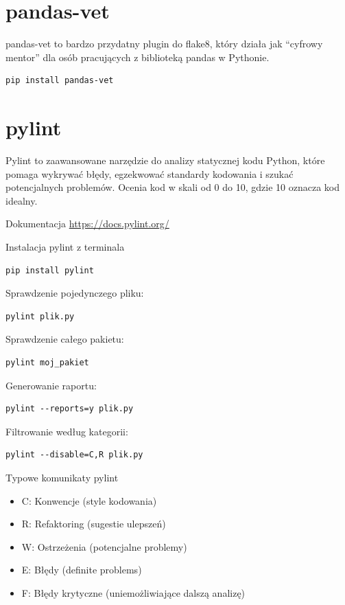 \documentclass[
  polish,
  letterpaper,
  DIV=11,
  numbers=noendperiod]{scrreprt}
\providecommand{\tightlist}{%
  \setlength{\itemsep}{0pt}\setlength{\parskip}{0pt}}
\begin{document}
\section{pandas-vet}\label{pandas-vet}

pandas-vet to bardzo przydatny plugin do flake8, który działa jak
``cyfrowy mentor'' dla osób pracujących z biblioteką pandas w Pythonie.

\begin{verbatim}
pip install pandas-vet
\end{verbatim}

\section{pylint}\label{pylint}

Pylint to zaawansowane narzędzie do analizy statycznej kodu Python,
które pomaga wykrywać błędy, egzekwować standardy kodowania i szukać
potencjalnych problemów. Ocenia kod w skali od 0 do 10, gdzie 10 oznacza
kod idealny.

Dokumentacja \url{https://docs.pylint.org/}

Instalacja pylint z terminala

\begin{verbatim}
pip install pylint
\end{verbatim}

Sprawdzenie pojedynczego pliku:

\begin{verbatim}
pylint plik.py
\end{verbatim}

Sprawdzenie całego pakietu:

\begin{verbatim}
pylint moj_pakiet
\end{verbatim}

Generowanie raportu:

\begin{verbatim}
pylint --reports=y plik.py
\end{verbatim}

Filtrowanie według kategorii:

\begin{verbatim}
pylint --disable=C,R plik.py
\end{verbatim}

Typowe komunikaty pylint

\begin{itemize}
\tightlist
\item
  C: Konwencje (style kodowania)
\item
  R: Refaktoring (sugestie ulepszeń)
\item
  W: Ostrzeżenia (potencjalne problemy)
\item
  E: Błędy (definite problems)
\item
  F: Błędy krytyczne (uniemożliwiające dalszą analizę)
\end{itemize}
\end{document}
